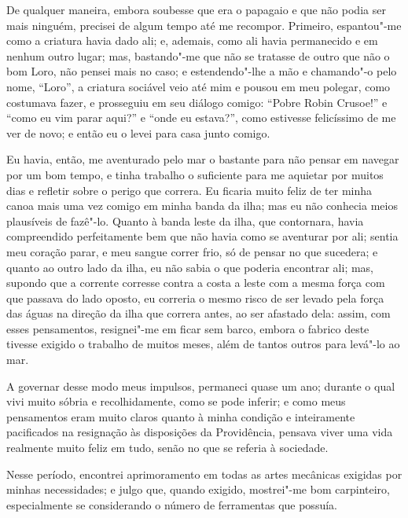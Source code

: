 De qualquer maneira, embora soubesse que era o papagaio e que não podia
ser mais ninguém, precisei de algum tempo até me recompor. Primeiro,
espantou"-me como a criatura havia dado ali; e, ademais, como ali havia
permanecido e em nenhum outro lugar; mas, bastando"-me que não se
tratasse de outro que não o bom Loro, não pensei mais no caso; e
estendendo"-lhe a mão e chamando"-o pelo nome, ``Loro'', a criatura
sociável veio até mim e pousou em meu polegar, como costumava fazer, e
prosseguiu em seu diálogo comigo: ``Pobre Robin Crusoe!'' e ``como eu
vim parar aqui?'' e ``onde eu estava?'', como estivesse felicíssimo de
me ver de novo; e então eu o levei para casa junto comigo.

Eu havia, então, me aventurado pelo mar o bastante para não pensar em
navegar por um bom tempo, e tinha trabalho o suficiente para me aquietar
por muitos dias e refletir sobre o perigo que correra. Eu ficaria muito
feliz de ter minha canoa mais uma vez comigo em minha banda da ilha; mas
eu não conhecia meios plausíveis de fazê"-lo. Quanto à banda leste da
ilha, que contornara, havia compreendido perfeitamente bem que não havia
como se aventurar por ali; sentia meu coração parar, e meu sangue correr
frio, só de pensar no que sucedera; e quanto ao outro lado da ilha, eu
não sabia o que poderia encontrar ali; mas, supondo que a corrente
corresse contra a costa a leste com a mesma força com que passava do
lado oposto, eu correria o mesmo risco de ser levado pela força das
águas na direção da ilha que correra antes, ao ser afastado dela: assim,
com esses pensamentos, resignei"-me em ficar sem barco, embora o fabrico
deste tivesse exigido o trabalho de muitos meses, além de tantos outros
para levá"-lo ao mar.

A governar desse modo meus impulsos, permaneci quase um ano; durante o
qual vivi muito sóbria e recolhidamente, como se pode inferir; e como
meus pensamentos eram muito claros quanto à minha condição e
inteiramente pacificados na resignação às disposições da Providência,
pensava viver uma vida realmente muito feliz em tudo, senão no que se
referia à sociedade.

Nesse período, encontrei aprimoramento em todas as artes mecânicas
exigidas por minhas necessidades; e julgo que, quando exigido,
mostrei"-me bom carpinteiro, especialmente se considerando o número de
ferramentas que possuía.

